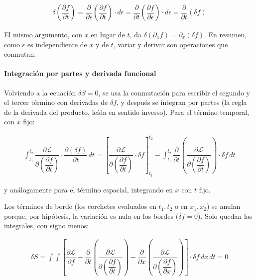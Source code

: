 \documentclass[
  spanish,
]{article}
\begin{document}
\[
\begin{aligned}
\delta \left( \dfrac{\partial f}{\partial t} \right) = \dfrac{\partial}{\partial \epsilon} \left( \dfrac{\partial f}{\partial t} \right) \cdot d\epsilon = \dfrac{\partial}{\partial t} \left( \dfrac{\partial f}{\partial \epsilon} \right) \cdot d\epsilon = \dfrac{\partial}{\partial t} (\delta f)
\end{aligned}
\]

El mismo argumento, con \(x\) en lugar de \(t\), da
\(\delta(\partial_x f) = \partial_x(\delta f)\). En resumen, como
\(\epsilon\) es independiente de \(x\) y de \(t\), variar y derivar son
operaciones que conmutan.

\paragraph{Integración por partes y derivada
funcional}\label{integraciuxf3n-por-partes-y-derivada-funcional}

Volviendo a la ecuación \(\delta S=0\), se usa la conmutación para
escribir el segundo y el tercer término con derivadas de \(\delta f\), y
después se integran por partes (la regla de la derivada del producto,
leída en sentido inverso). Para el término temporal, con \(x\) fijo:

\[
\begin{aligned}
\int_{t_1}^{t_2} \dfrac{\partial \mathcal{L}}{\partial \left(\dfrac{\partial f}{\partial t}\right)} \cdot \dfrac{\partial (\delta f)}{\partial t} \, dt
= \left[ \dfrac{\partial \mathcal{L}}{\partial \left(\dfrac{\partial f}{\partial t}\right)} \cdot \delta f \right]_{t_1}^{t_2}
- \int_{t_1}^{t_2} \dfrac{\partial}{\partial t}\left( \dfrac{\partial \mathcal{L}}{\partial \left(\dfrac{\partial f}{\partial t}\right)} \right) \cdot \delta f \, dt
\end{aligned}
\]

y análogamente para el término espacial, integrando en \(x\) con \(t\)
fijo.

Los términos de borde (los corchetes evaluados en \(t_1, t_2\) o en
\(x_1, x_2\)) se anulan porque, por hipótesis, la variación es nula en
los bordes (\(\delta f = 0\)). Solo quedan las integrales, con signo
menos:

\[
\begin{aligned}
\delta S = \int \int \left[ \dfrac{\partial \mathcal{L}}{\partial f} - \dfrac{\partial}{\partial t}\left( \dfrac{\partial \mathcal{L}}{\partial \left(\dfrac{\partial f}{\partial t}\right)} \right) - \dfrac{\partial}{\partial x}\left( \dfrac{\partial \mathcal{L}}{\partial \left(\dfrac{\partial f}{\partial x}\right)} \right) \right] \cdot \delta f \, dx \, dt = 0
\end{aligned}
\]
\end{document}
